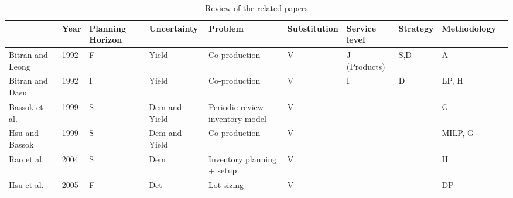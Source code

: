 \documentclass[11pt]{article}
\begin{document}
\begin{table}[]
\caption{Review of the related papers}
\begin{adjustbox}{width=1\textwidth,center=\textwidth}
\begin{tabular}{llllllllll}
\toprule
                          & Year                                    & Planning Horizon                        & Uncertainty                       & Problem                         & Substitution        & Service level                & Strategy       & Methodology               &              \\
                          \midrule

Bitran and Leong~\cite{bitran1992deterministic}         & 1992                                    & F                                       & Yield                             & Co-production                   & V                   & J (Products)                 & S,D            & A                         &              \\
Bitran and Dasu~\cite{bitran1992ordering}           & 1992                                    & I                                       & Yield                             & Co-production                   & V                   & I                            & D              & LP, H                     &              \\
Bassok et al.~\cite{bassok1999single}             & 1999                                    & S                                       & Dem and Yield                     & Periodic review inventory model & V                   &                              &                &  G                         &              \\
Hsu and Bassok~\cite{hsu1999random}            & 1999                                    & S                                       & Dem and Yield                     & Co-production                   & V                   &                              &                & MILP, G                   &              \\
Rao et al.~\cite{rao2004multi}                & 2004                                    &   S                                      & Dem                               & Inventory planning + setup      & V                   &                              &                & H                         &              \\
Hsu et al.~\cite{hsu2005dynamic}                & 2005                                    & F                                       & Det                               & Lot sizing                      & V                   &                              &                &                  DP         &              \\

\end{tabular}
\end{adjustbox}
\end{table}
\end{document}
